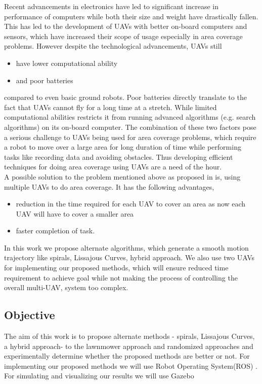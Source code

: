 Recent advancements in electronics have led to significant increase in performance of computers while both their size and weight have drastically fallen. This has led to the development of UAVs with better on-board computers and sensors, which have increased their scope of usage especially in area coverage problems. However despite the technological advancements, UAVs still
\begin{itemize}
\item have lower computational ability 
\item and poor batteries 
\end{itemize}
compared to even basic ground robots. Poor batteries directly translate to the fact that UAVs cannot fly for a long time at a stretch. While limited computational abilities restricts it from running advanced algorithms (e.g. search algorithms) on its on-board computer. The combination of these two factors pose a serious challenge to UAVs being used for area coverage problems, which require a robot to move over a large area for long duration of time while performing tasks like recording data and avoiding obstacles. Thus developing efficient techniques for doing area coverage using UAVs are a need of the hour. \\ 
A possible solution to the problem mentioned above as proposed in \cite{1} is, using multiple UAVs to do area coverage. It has the following advantages,
\begin{itemize}
\item reduction in the time required for each UAV to cover an area as now each UAV will have to cover a smaller area
\item faster completion of task.
\end{itemize}  
In this work we propose alternate algorithms, which generate a smooth motion trajectory  like spirals, Lissajous Curves, hybrid approach.  We also use two UAVs for implementing our proposed methods, which will ensure reduced time requirement to achieve goal while not making the process of controlling the overall multi-UAV, system too complex.
\subsection{Objective}
The aim of this work is to propose alternate methods - spirals, Lissajous Curves, a hybrid approach- to the lawnmower approach \cite{1} and randomized approaches \cite{10} and experimentally determine whether the proposed methods are better or not. For implementing our proposed methods we will use Robot Operating System(ROS) \cite{19}. For simulating and visualizing our results we will use Gazebo \cite{20}
